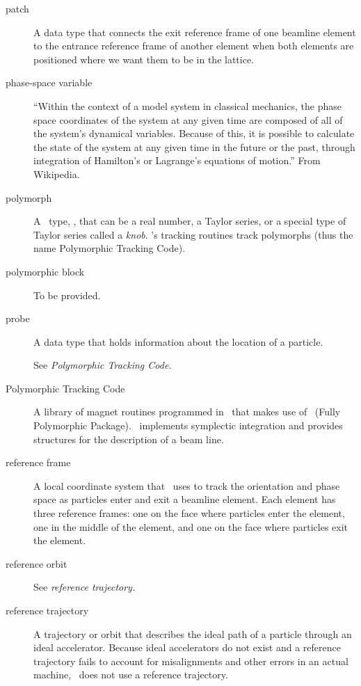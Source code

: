 \begin{description}
  \item[patch]
A data type that connects the exit reference frame of one beamline
element to the entrance reference frame of another element when both
elements are positioned where we want them to be in the lattice.

  \item[phase-space variable]
``Within the context of a model system in classical mechanics,
the phase space coordinates of the system at any given time are composed
of all of the system's dynamical variables. Because of this, it is
possible to calculate the state of the system at any given time in
the future or the past, through integration of Hamilton's or Lagrange's
equations of motion.'' From Wikipedia.

   \item[polymorph]
A \Fninety\ type, , that can be a real number, a Taylor series,
or a special type of Taylor series called a \emph{knob}. \PTC's tracking routines track
polymorphs (thus the name Polymorphic Tracking Code).

  \item[polymorphic block]
To be provided.

  \item[probe]
A data type that holds information about the location of a particle.

  \item[\PTC]
See \emph{Polymorphic Tracking Code.}

  \item[Polymorphic Tracking Code]
A library of magnet routines programmed in \Fninety\ that makes use
of \FPP\ (Fully Polymorphic Package). \PTC\ implements symplectic
integration and provides structures for the description of a beam line.

  \item[reference frame]
A local coordinate system that \PTC\ uses to track the orientation and
phase space as particles enter and exit a beamline element. Each
element has three reference frames: one on the face where particles
enter the element, one in the middle of the element, and one on the face
where particles exit the element.

  \item[reference orbit]
See \emph{reference trajectory.}

  \item[reference trajectory]
A trajectory or orbit that describes the ideal path of a particle through
an ideal accelerator. Because ideal accelerators do not exist and a 
reference trajectory fails to account for misalignments and other errors
in an actual machine, \PTC\ does not use a reference trajectory.


\end{description}
